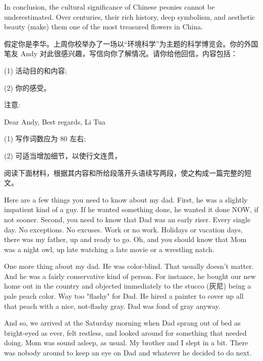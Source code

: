 \documentclass{英语试卷}
\begin{document}
\par In conclusion, the cultural significance of Chinese peonies cannot be underestimated. Over centuries, their rich history, deep symbolism, and aesthetic beauty  (make) them one of the most treasured flowers in China.\par
{}
\par 假定你是李华。上周你校举办了一场以“环境科学”为主题的科学博览会。你的外国笔友 Andy 对此很感兴趣，写信向你了解情况。请你给他回信，内容包括：\par
\par (1) 活动目的和内容;\par
\par (2) 你的感受。\par
\par 注意:\par
\par Dear Andy, Best regards, Li Tua\par
\par (1) 写作词数应为 80 左右;\par
\par (2) 可适当增加细节，以使行文连贯，\par
{}
\par 阅读下面材料，根据其内容和所给段落开头语续写两段，使之构成一篇完整的短文。\par
\par Here are a few things you need to know about my dad. First, he was a slightly impatient kind of a guy. If he wanted something done, he wanted it done NOW, if not sooner. Second, you need to know that Dad was an early riser. Every single day. No exceptions. No excuses. Work or no work. Holidays or vacation days, there was my father, up and ready to go. Oh, and you should know that Mom was a night owl, up late watching a late movie or a wrestling natch.\par
\par One more thing about my dad. He was color-blind. That usually doesn't matter. And he was a fairly conservative kind of person. For instance, he bought our new home out in the country and objected immediately to the stucco (灰尼) being a pale peach color. Way too "flashy" for Dad. He hired a painter to cover up all that peach with a nice, not-flashy gray. Dad was fond of gray anyway.\par
\par And so, we arrived at the Saturday morning when Dad sprang out of bed as bright-eyed as ever, felt restless, and looked around for something that needed doing. Mom was sound asleep, as usual. My brother and I slept in a bit. There was nobody around to keep an eye on Dad and whatever he decided to do next.\par
\end{document}
